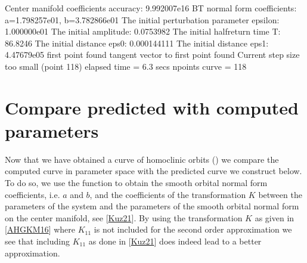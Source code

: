 \documentclass[letterpaper,10pt,english]{jupyterBook}
\begin{document}
\begin{sphinxVerbatim}[commandchars=\\\{\}]
Center manifold coefficients\PYGZsq{} accuracy: 9.992007e\PYGZhy{}16
BT normal form coefficients:
a=1.798257e\PYGZhy{}01,	 b=\PYGZhy{}3.782866e\PYGZhy{}01
The initial perturbation parameter epsilon:  1.000000e\PYGZhy{}01
The initial amplitude: 0.0753982
The initial half\PYGZhy{}return time T: 86.8246
The initial distance eps0: 0.000144111
The initial distance eps1: 4.47679e\PYGZhy{}05
first point found
tangent vector to first point found
Current step size too small (point 118)
elapsed time  = 6.3 secs
npoints curve = 118
\end{sphinxVerbatim}


\section{Compare predicted with computed parameters}
\label{\detokenize{PredatorPrey:compare-predicted-with-computed-parameters}}
\sphinxAtStartPar
Now that we have obtained a curve of homoclinic orbits () we
compare the computed curve in parameter space with the predicted curve we
construct below. To do so, we use the function  to obtain the
smooth orbital normal form coefficients, i.e. \(a\) and \(b\), and the coefficients
of the transformation \(K\) between the parameters of the system and the parameters
of the smooth orbital normal form on the center manifold, see
{[}\hyperlink{cite.references:id3}{Kuz21}{]}. By using the transformation \(K\) as given in
{[}\hyperlink{cite.references:id2}{AHGKM16}{]} where \(K_{11}\) is not included for the second order
approximation we see that including \(K_{11}\) as done in {[}\hyperlink{cite.references:id3}{Kuz21}{]}
does indeed lead to a better approximation.
\end{document}
